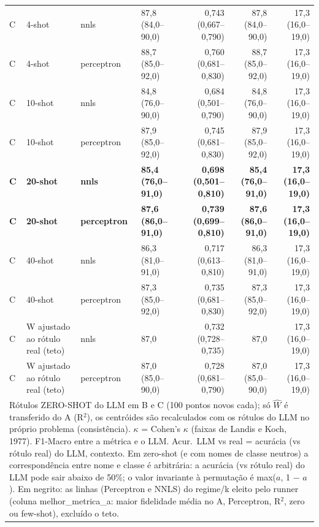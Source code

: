 \begin{table}[htbp]
\begin{tabular}{llllrrr}
C & 4-shot & nnls & 87,8 (84,0–90,0) & 0,743 (0,667–0,790) & 87,8 (84,0–90,0) & 17,3 (16,0–19,0) \\
C & 4-shot & perceptron & 88,7 (85,0–92,0) & 0,760 (0,681–0,830) & 88,7 (85,0–92,0) & 17,3 (16,0–19,0) \\
C & 10-shot & nnls & 84,8 (76,0–90,0) & 0,684 (0,501–0,790) & 84,8 (76,0–90,0) & 17,3 (16,0–19,0) \\
C & 10-shot & perceptron & 87,9 (85,0–92,0) & 0,745 (0,681–0,830) & 87,9 (85,0–92,0) & 17,3 (16,0–19,0) \\
\textbf{C} & \textbf{20-shot} & \textbf{nnls} & \textbf{85,4 (76,0–91,0)} & \textbf{0,698 (0,501–0,810)} & \textbf{85,4 (76,0–91,0)} & \textbf{17,3 (16,0–19,0)} \\
\textbf{C} & \textbf{20-shot} & \textbf{perceptron} & \textbf{87,6 (86,0–91,0)} & \textbf{0,739 (0,699–0,810)} & \textbf{87,6 (86,0–91,0)} & \textbf{17,3 (16,0–19,0)} \\
C & 40-shot & nnls & 86,3 (81,0–91,0) & 0,717 (0,613–0,810) & 86,3 (81,0–91,0) & 17,3 (16,0–19,0) \\
C & 40-shot & perceptron & 87,3 (85,0–92,0) & 0,735 (0,681–0,830) & 87,3 (85,0–92,0) & 17,3 (16,0–19,0) \\
C & W ajustado ao rótulo real (teto) & nnls & 87,0 & 0,732 (0,728–0,735) & 87,0 & 17,3 (16,0–19,0) \\
C & W ajustado ao rótulo real (teto) & perceptron & 87,0 (85,0–90,0) & 0,728 (0,681–0,790) & 87,0 (85,0–90,0) & 17,3 (16,0–19,0) \\
\bottomrule
\multicolumn{7}{p{0.95\linewidth}}{\footnotesize Rótulos ZERO-SHOT do LLM em B e C (100 pontos novos cada); só $\hat{W}$ é transferido do A (R$^2$), os centróides são recalculados com os rótulos do LLM no próprio problema (consistência). $\kappa$ = Cohen's $\kappa$ (faixas de Landis e Koch, 1977). F1-Macro entre a métrica e o LLM. Acur.\ LLM vs real = acurácia (vs rótulo real) do LLM, contexto. Em zero-shot (e com nomes de classe neutros) a correspondência entre nome e classe é arbitrária: a acurácia (vs rótulo real) do LLM pode sair abaixo de 50\%; o valor invariante à permutação é max($a$, 1 $-$ $a$). Em negrito: as linhas (Perceptron e NNLS) do regime/k eleito pelo runner (coluna melhor\_metrica\_a: maior fidelidade média no A, Perceptron, R$^2$, zero ou few-shot), excluído o teto.} \\
\end{tabular}
\end{table}
